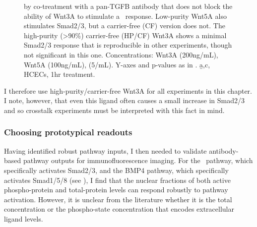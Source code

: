 \begin{figure}[!bt]
{{          by co-treatment with a pan-TGFB antibody that does
          not block the ability of Wnt3A to stimulate a \bcat\
          response. Low-purity Wnt5A also stimulates Smad2/3,
          but a carrier-free (CF) version does not. The high-purity (>90\%)
          carrier-free (HP/CF) Wnt3A shows a minimal Smad2/3
          response that is reproducible in other experiments, though not significant
          in this one. Concentrations: Wnt3A (200ng/mL),
          Wnt5A (100ng/mL),  (5/mL).
          Y-axes and p-values as in 
          .
          \b{a,c}, HCECs, 1hr treatment.}
  \label{fig:insulation:contamination}}
  \end{figure}

  
I therefore use high-purity/carrier-free Wnt3A for all experiments
in this chapter. I note, however, that even this ligand often causes
a small increase in Smad2/3 and so crosstalk experiments must be
interpreted with this fact in mind.

  
\subsubsection{Choosing prototypical readouts}


Having identified robust pathway inputs, I then needed to validate
antibody-based pathway outputs for immunofluorescence imaging.
For the \tgf\ pathway, which specifically activates Smad2/3,
and the BMP4 pathway, which specifically activates Smad1/5/8
(see ),
I find that the nuclear fractions of both active phospho-protein and
total-protein levels can respond robustly to pathway activation.
However, it is unclear from the literature whether it is the total
concentration or the phospho-state concentration that encodes
extracellular ligand levels.


